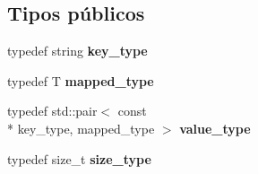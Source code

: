 \subsection*{Tipos públicos}
\begin{DoxyCompactItemize}
\item 
\hypertarget{classstring__map_ac6b29d74d0658db5938f53b66394d2ca}{typedef string {\bfseries key\-\_\-type}}\label{classstring__map_ac6b29d74d0658db5938f53b66394d2ca}

\item 
\hypertarget{classstring__map_a87309fe41124ea0f9f9fe22729e1fdf7}{typedef T {\bfseries mapped\-\_\-type}}\label{classstring__map_a87309fe41124ea0f9f9fe22729e1fdf7}

\item 
\hypertarget{classstring__map_aba7d0f8b84310cf46a990b404834074b}{typedef std\-::pair$<$ const \\*
key\-\_\-type, mapped\-\_\-type $>$ {\bfseries value\-\_\-type}}\label{classstring__map_aba7d0f8b84310cf46a990b404834074b}

\item 
\hypertarget{classstring__map_a91a355e52de423b8385b72caf553e3de}{typedef size\-\_\-t {\bfseries size\-\_\-type}}\label{classstring__map_a91a355e52de423b8385b72caf553e3de}

\end{DoxyCompactItemize}
